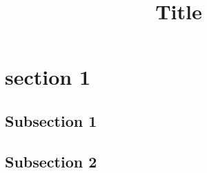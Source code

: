 \documentclass[14pt, a4paper,handout]{beamer}
\title{Title}
\begin{document}
\section{section 1}

\subsection{Subsection 1}
\begin{frame}
\end{frame}

\begin{frame}
\end{frame}

\subsection{Subsection 2}
\begin{frame}
\end{frame}
\end{document}

